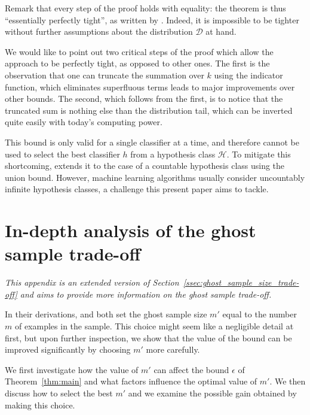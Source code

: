 \documentclass[twoside,11pt]{article}
\newcommand{\D}{\mathcal{D}}
\renewcommand{\H}{{\mathcal{H}}}
\begin{document}
Remark that every step of the proof holds with equality: the theorem is thus ``essentially perfectly tight'', as written by \cite{langford05}.
Indeed, it is impossible to be tighter without further assumptions about the distribution $\D$ at hand.

We would like to point out two critical steps of the proof which allow the approach to be perfectly tight, as opposed to other ones.
The first is the observation that one can truncate the summation over $k$ using the indicator function, which eliminates superfluous terms leads to major improvements over other bounds.
The second, which follows from the first, is to notice that the truncated sum is nothing else than the distribution tail, which can be inverted quite easily with today's computing power.

This bound is only valid for a single classifier at a time, and therefore cannot be used to select the best classifier $h$ from a hypothesis class $\H$.
To mitigate this shortcoming, \cite{langford05} extends it to the case of a countable hypothesis class using the union bound.
However, machine learning algorithms usually consider uncountably infinite hypothesis classes, a challenge this present paper aims to tackle.


\clearpage















\section{In-depth analysis of the ghost sample trade-off}
\label{app:ghost_sample_size_tradeoff}

\emph{
This appendix is an extended version of Section~\ref{ssec:ghost_sample_size_trade-off} and aims to provide more information on the ghost sample trade-off.
}

In their derivations, \cite{vapnik98} and \cite{as-93} both set the ghost sample size $m'$ equal to the number $m$ of examples in the sample.
This choice might seem like a negligible detail at first, but upon further inspection, we show that the value of the bound can be improved significantly by choosing $m'$ more carefully.

We first investigate how the value of $m'$ can affect the bound $\epsilon$ of Theorem~\ref{thm:main} and what factors influence the optimal value of $m'$.
We then discuss how to select the best $m'$ and we examine the possible gain obtained by making this choice.
\end{document}
